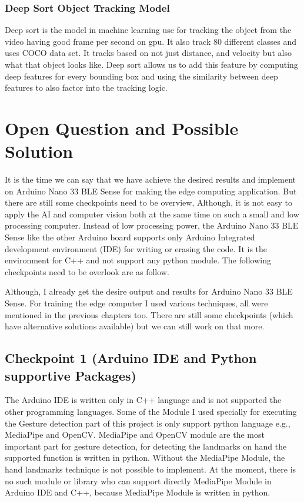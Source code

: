 \subsection{Deep Sort Object Tracking Model}
Deep sort is the model in machine learning use for tracking the object from the video having good frame per second on gpu. It also track 80 different classes and uses COCO data set. It tracks based on not just distance, and velocity but also what that object looks like. Deep sort allows us to add this feature by computing deep features for every bounding box and using the similarity between deep features to also factor into the tracking logic.











\chapter{Open Question and Possible Solution}
It is the time we can say that we have achieve the desired results and implement on Arduino Nano 33 BLE Sense for making the edge computing application. But there are still some checkpoints need to be overview, Although, it is not easy to apply the AI and computer vision both at the same time on such a small and low processing computer.  Instead of low processing power, the Arduino Nano 33 BLE Sense like the other Arduino board supports only Arduino Integrated development environment (IDE) for writing or erasing the code. It is the environment for C++ and not support any python module. The following checkpoints need to be overlook are as follow.


Although, I already get the desire output and results for Arduino Nano 33 BLE Sense. For training the edge computer I used various techniques, all were mentioned in the previous chapters too. There are still some checkpoints (which have alternative solutions available) but we can still work on that more.
\section{Checkpoint 1 (Arduino IDE and Python supportive Packages)}
The Arduino IDE is written only in C++ language and is not supported the other programming languages. Some of the Module I used specially for executing the Gesture detection part of this project is only support python language e.g., MediaPipe and OpenCV. MediaPipe and OpenCV module are the most important part for gesture detection, for detecting the landmarks on hand the supported function is written in python. Without the MediaPipe Module, the hand landmarks technique is not possible to implement. At the moment, there is no such module or library who can support directly MediaPipe Module in Arduino IDE and C++, because MediaPipe Module is written in python. 

